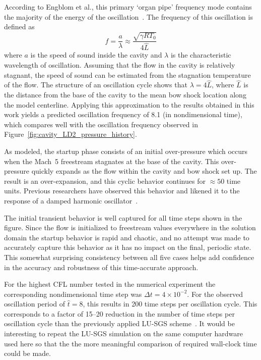 According to Engblom et al., this primary `organ pipe' frequency mode contains the majority of the energy of the oscillation~\cite{engblom_goldstein_AIAA-1996-667}. The frequency of this oscillation is defined as
\begin{equation}
  f = \frac{a}{\lambda} \approx \frac{\sqrt{\gamma R T_0}}{4 \hat{L}}
\end{equation}
where $a$ is the speed of sound inside the cavity and $\lambda$ is the characteristic wavelength of oscillation.  Assuming that the flow in the cavity is relatively stagnant, the speed of sound can be estimated from the stagnation temperature of the flow.  The structure of an oscillation cycle shows that $\lambda=4\hat{L}$, where $\hat{L}$ is the distance from the base of the cavity to the mean bow shock location along the model centerline. Applying this approximation to the results obtained in this work yields a predicted oscillation frequency of 8.1 (in nondimensional time), which compares well with the oscillation frequency observed in Figure~\ref{fig:cavity_LD2_pressure_history}.
    

As modeled, the startup phase consists of an initial over-pressure which occurs when the Mach~5 freestream stagnates at the base of the cavity.  This over-pressure quickly expands as the flow within the cavity and bow shock set up.  The result is an over-expansion, and this cyclic behavior continues for $\approx 50$ time units.  Previous researchers have observed this behavior and likened it to the response of a damped harmonic oscillator~\cite{engblom_goldstein_AIAA-1996-667,engblom_goldstein_AIAA-1996-354}.

The initial transient behavior is well captured for all time steps shown in the figure.  Since the flow is initialized to freestream values everywhere in the solution domain the startup behavior is rapid and chaotic, and no attempt was made to accurately capture this behavior as it has no impact on the final, periodic state.  This somewhat surprising consistency between all five cases helps add confidence in the accuracy and robustness of this time-accurate approach.

For the highest CFL number tested in the numerical experiment the corresponding nondimensional time step was $\Delta t=4\times 10^{-2}$. For the observed oscillation period of $\hat{t}=8$, this results in 200 time steps per oscillation cycle.  This corresponds to a factor of 15--20 reduction in the number of time steps per oscillation cycle than the previously applied LU-SGS scheme~\cite{engblom_goldstein_AIAA-1996-354}.  It would be interesting to repeat the LU-SGS simulation on the same computer hardware used here so that the the more meaningful comparison of required wall-clock time could be made.


